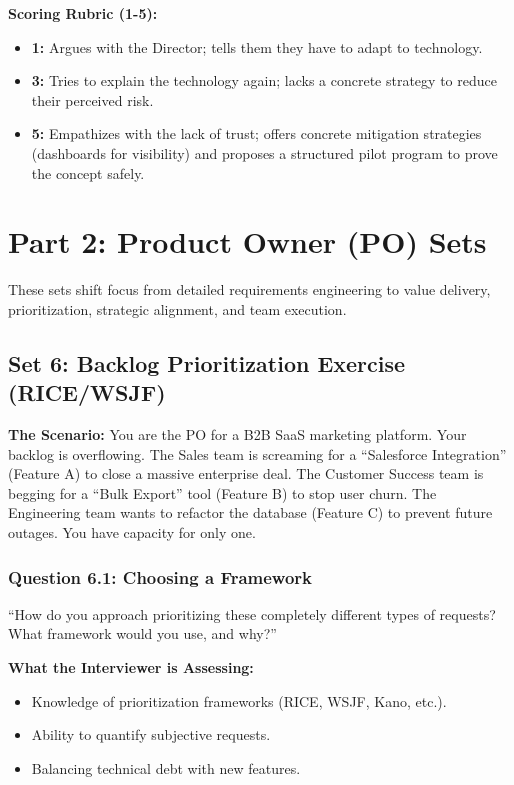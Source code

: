 \documentclass[
  11pt,
  openany,
  oneside]{book}
\providecommand{\tightlist}{%
  \setlength{\itemsep}{0pt}\setlength{\parskip}{0pt}}
\begin{document}
\textbf{Scoring Rubric (1-5):}

\begin{itemize}
\tightlist
\item
  \textbf{1:} Argues with the Director; tells them they have to adapt to
  technology.
\item
  \textbf{3:} Tries to explain the technology again; lacks a concrete
  strategy to reduce their perceived risk.
\item
  \textbf{5:} Empathizes with the lack of trust; offers concrete
  mitigation strategies (dashboards for visibility) and proposes a
  structured pilot program to prove the concept safely.
\end{itemize}

\bigskip

\section{Part 2: Product Owner (PO)
Sets}\label{part-2-product-owner-po-sets}

These sets shift focus from detailed requirements engineering to value
delivery, prioritization, strategic alignment, and team execution.

\subsection{Set 6: Backlog Prioritization Exercise
(RICE/WSJF)}\label{set-6-backlog-prioritization-exercise-ricewsjf}

\textbf{The Scenario:} You are the PO for a B2B SaaS marketing platform.
Your backlog is overflowing. The Sales team is screaming for a
``Salesforce Integration'' (Feature A) to close a massive enterprise
deal. The Customer Success team is begging for a ``Bulk Export'' tool
(Feature B) to stop user churn. The Engineering team wants to refactor
the database (Feature C) to prevent future outages. You have capacity
for only one.

\subsubsection{Question 6.1: Choosing a
Framework}\label{question-6.1-choosing-a-framework}

``How do you approach prioritizing these completely different types of
requests? What framework would you use, and why?''

\textbf{What the Interviewer is Assessing:}

\begin{itemize}
\tightlist
\item
  Knowledge of prioritization frameworks (RICE, WSJF, Kano, etc.).
\item
  Ability to quantify subjective requests.
\item
  Balancing technical debt with new features.
\end{itemize}
\end{document}
